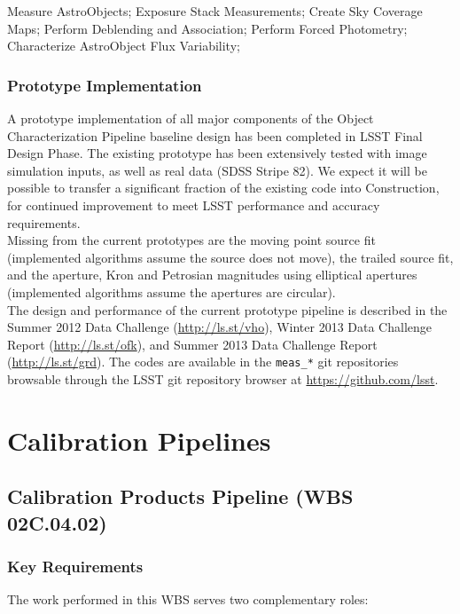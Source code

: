 \documentclass[12pt]{article}
\newcommand{\wbsCPP}{WBS 02C.04.02}
\begin{document}
Measure AstroObjects; Exposure Stack Measurements;
Create Sky Coverage Maps; Perform Deblending and Association; Perform Forced Photometry; Characterize AstroObject Flux Variability;

\subsubsection{Prototype Implementation}

A prototype implementation of all major components of the Object Characterization Pipeline baseline design has been completed in LSST Final Design Phase. The existing prototype has been extensively tested with image simulation inputs, as well as real data (SDSS Stripe 82). We expect it will be possible to transfer a significant fraction of the existing code into Construction, for continued improvement to meet LSST performance and accuracy requirements.
\\

Missing from the current prototypes are the moving point source fit (implemented algorithms assume the source does not move), the trailed source fit, and the aperture, Kron and Petrosian magnitudes using elliptical apertures (implemented algorithms assume the apertures are circular).
\\

The design and performance of the current prototype pipeline is described in the Summer 2012 Data Challenge (\url{http://ls.st/vho}), Winter 2013 Data Challenge Report (\url{http://ls.st/ofk}), and Summer 2013 Data Challenge Report (\url{http://ls.st/grd}). The codes are available in the {\tt meas\_*} git repositories browsable through the LSST git repository browser at \url{https://github.com/lsst}.

\clearpage

\section{Calibration Pipelines}

\subsection{Calibration Products Pipeline (\wbsCPP)}

\subsubsection{Key Requirements}

The work performed in this WBS serves two complementary roles:
\end{document}
